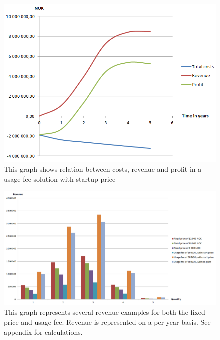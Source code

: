\begin{figure}
\begin{center}
\includegraphics[scale=0.8]{profitusagefee}
\caption[Profit, Revenue and Cost for a Usage Fee Solution]{This graph shows relation between costs, revenue and profit in a usage fee solution with startup price}
\label{fig:ProfitUsageFee}
\end{center}
\end{figure}

\begin{figure}
\begin{center}
\includegraphics[angle=90,scale=0.5]{revenueall}
\caption[Revenue examples for both fixed price model and usage fee model]{This graph represents several revenue examples for both the fixed price and usage fee. Revenue is represented on a per year basis. See appendix for calculations.}
\label{fig:RevenueAll}
\end{center}
\end{figure}
